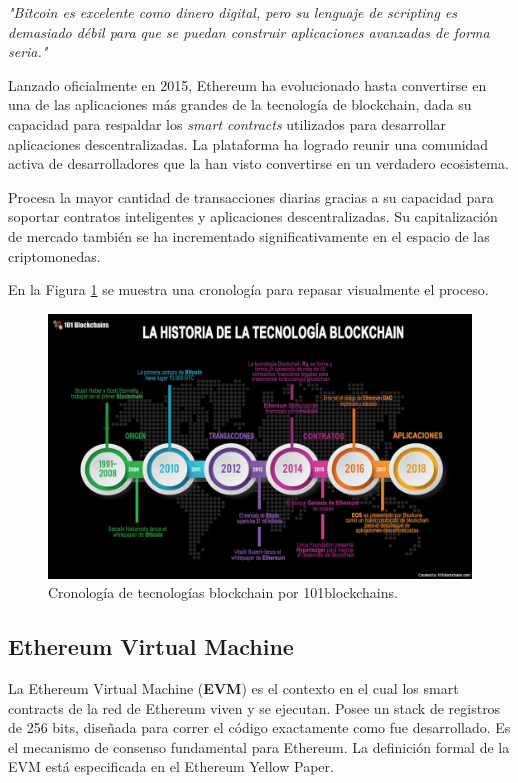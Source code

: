 \begin{displayquote}
\textit{"Bitcoin es excelente como dinero digital, pero su lenguaje de scripting es demasiado débil para que se puedan construir aplicaciones avanzadas de forma seria."}
\end{displayquote}

Lanzado oficialmente en 2015, Ethereum ha evolucionado hasta convertirse en una de las aplicaciones más grandes de la tecnología de blockchain, dada su capacidad para respaldar los \textit{smart contracts} utilizados para desarrollar aplicaciones descentralizadas. La plataforma ha logrado reunir una comunidad activa de desarrolladores que la han visto convertirse en un verdadero ecosistema.

Procesa la mayor cantidad de transacciones diarias gracias a su capacidad para soportar contratos inteligentes y aplicaciones descentralizadas. Su capitalización de mercado también se ha incrementado significativamente en el espacio de las criptomonedas.

En la Figura \ref{fig:blockchain history} se muestra una cronología para repasar visualmente el proceso.

\begin{figure}[h]
    \centering
    \includegraphics[scale=0.3]{images/historiablockchain.jpg}
    \caption{ Cronología de tecnologías blockchain por 101blockchains.}
    \label{fig:blockchain history}
\end{figure}

\subsection{Ethereum Virtual Machine}
La Ethereum Virtual Machine (\textbf{EVM}) es el contexto en el cual los smart contracts de la red de Ethereum viven y se ejecutan. Posee un stack de registros de 256 bits, diseñada para correr el código exactamente como fue desarrollado. Es el mecanismo de consenso fundamental para Ethereum. La definición formal de la EVM está especificada en el Ethereum Yellow Paper.

